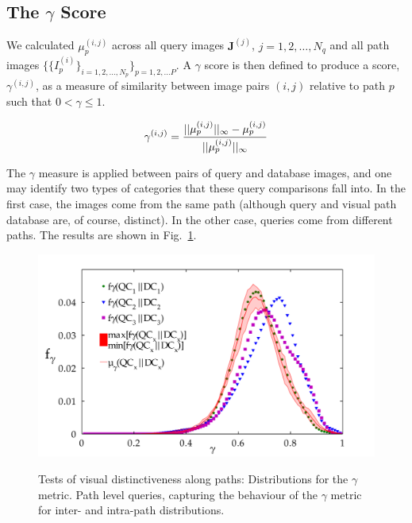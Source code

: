 \subsection{The $\gamma$ Score} We calculated  $\mu_p^{(i,j)}$ across all query images $\mathbf{J}^{(j)}$, $j=1,2,\ldots,N_q$ and all path images $\lbrace\lbrace I^{(i)}_p\rbrace_{i=1,2,\ldots,N_p}\rbrace_{p=1,2,\ldots P}$.   A $\gamma$ score is then defined to produce a score, $\gamma^{(i,j)}$, as a measure of similarity between image pairs $(i,j)$ relative to path $p$ such that $0 < \gamma \le 1$. 


\begin{equation}
\centering
\gamma^{(i,j)} = \frac{||\mu^{(i,j)}_p||_{\infty}-\mu^{(i,j)}_p}{||\mu^{(i,j)}_p||_{\infty}}
\end{equation}

The $\gamma$ measure is applied between pairs of query and database images, and one may identify two types of categories that these query comparisons fall into.  In the first case, the images come from the same path (although query and visual path database are, of course, distinct).  In the other case, queries come from different paths.  The results are shown in Fig.~\ref{fig:gammaDistribution}.   

\begin{figure}[ht]
\centering
{\includegraphics[width=\linewidth]{./gfx/Chapter02/path_pdf_analysisWithShadedBetweensALLDB.pdf}}
\caption{Tests of visual distinctiveness along paths: Distributions for the $\gamma$ metric. Path level queries, capturing the behaviour of the $\gamma$ metric for inter- and intra-path distributions.}
\label{fig:gammaDistribution}
\end{figure}
 



